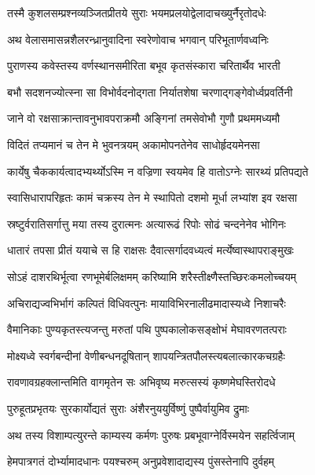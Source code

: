 \twolineshloka
{तस्मै कुशलसम्प्रश्नव्यञ्जितप्रीतये सुराः}
{भयमप्रलयोद्वेलादाचख्युर्नैरृतोदधेः} %

\twolineshloka
{अथ वेलासमासन्नशैलरन्ध्रानुवादिना}
{स्वरेणोवाच भगवान् परिभूतार्णवध्वनिः} %

\twolineshloka
{पुराणस्य कवेस्तस्य वर्णस्थानसमीरिता}
{बभूव कृतसंस्कारा चरितार्थैव भारती} %

\twolineshloka
{बभौ सदशनज्योत्स्ना सा विभोर्वदनोद्गता}
{निर्यातशेषा चरणाद्गङ्गेवोर्ध्वप्रवर्तिनी} %

\twolineshloka
{जाने वो रक्षसाक्रान्तावनुभावपराक्रमौ}
{अङ्गिनां तमसेवोभौ गुणौ प्रथममध्यमौ} %

\twolineshloka
{विदितं तप्यमानं च तेन मे भुवनत्रयम्}
{अकामोपनतेनेव साधोर्हृदयमेनसा} %

\twolineshloka
{कार्येषु चैककार्यत्वादभ्यर्थ्योऽस्मि न वज्रिणा}
{स्वयमेव हि वातोऽग्नेः सारथ्यं प्रतिपद्यते} %

\twolineshloka
{स्वासिधारापरिहृतः कामं चक्रस्य तेन मे}
{स्थापितो दशमो मूर्धा लभ्यांश इव रक्षसा} %

\twolineshloka
{स्रष्टुर्वरातिसर्गात्तु मया तस्य दुरात्मनः}
{अत्यारूढं रिपोः सोढं चन्दनेनेव भोगिनः} %

\twolineshloka
{धातारं तपसा प्रीतं ययाचे स हि राक्षसः}
{दैवात्सर्गादवध्यत्वं मर्त्येष्वास्थापराङ्मुखः} %

\twolineshloka
{सोऽहं दाशरथिर्भूत्वा रणभूमेर्बलिक्षमम्}
{करिष्यामि शरैस्तीक्ष्णैस्तच्छिरःकमलोच्चयम्} %

\twolineshloka
{अचिराद्यज्वभिर्भागं कल्पितं विधिवत्पुनः}
{मायाविभिरनालीढमादास्यध्वे निशाचरैः} %

\twolineshloka
{वैमानिकाः पुण्यकृतस्त्यजन्तु मरुतां पथि}
{पुष्पकालोकसङ्क्षोभं मेघावरणतत्पराः} %

\twolineshloka
{मोक्ष्यध्वे स्वर्गबन्दीनां वेणीबन्धनदूषितान्}
{शापयन्त्रितपौलस्त्यबलात्कारकचग्रहैः} %

\twolineshloka
{रावणावग्रहक्लान्तमिति वागमृतेन सः}
{अभिवृष्य मरुत्सस्यं कृष्णमेघस्तिरोदधे} %

\twolineshloka
{पुरुहूतप्रभृतयः सुरकार्योद्यतं सुराः}
{अंशैरनुययुर्विष्णुं पुष्पैर्वायुमिव द्रुमाः} %

\twolineshloka
{अथ तस्य विशाम्पत्युरन्ते काम्यस्य कर्मणः}
{पुरुषः प्रबभूवाग्नेर्विस्मयेन सहर्त्विजाम्} %

\twolineshloka
{हेमपात्रगतं दोर्भ्यामादधानः पयश्चरुम्}
{अनुप्रवेशादाद्यस्य पुंसस्तेनापि दुर्वहम्} %

